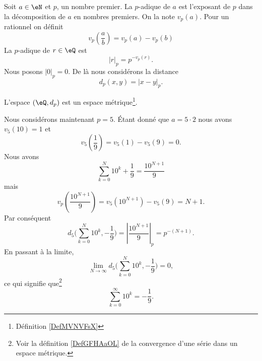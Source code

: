 Soit \( a\in \eN\) et \( p\), un nombre premier. La  \( p\)-adique de \( a\) est l'exposant de \( p\) dans la décomposition de \( a\) en nombres premiers. On la note \( v_p(a)\). Pour un rationnel on définit
\begin{equation}
    v_p\left( \frac{ a }{ b } \right)=v_p(a)-v_p(b)
\end{equation}
La  \( p\)-adique de \( r\in \eQ\) est 
\begin{equation}
    | r |_p=p^{-v_p(r)}.
\end{equation}
Nous posons \( | 0 |_p=0\). De là nous considérons la distance
\begin{equation}
    d_p(x,y)=| x-y |_p.
\end{equation}

\begin{lemma}
    L'espace \( (\eQ,d_p)\) est un espace métrique\footnote{Définition \ref{DefMVNVFsX}}.
\end{lemma}

Nous considérons maintenant \( p=5\). Étant donné que \( a=5\cdot 2\) nous avons \( v_5(10)=1\) et
\begin{equation}
    v_5\left( \frac{1}{ 9 } \right)=v_5(1)-v_5(9)=0.
\end{equation}
Nous avons
\begin{equation}
    \sum_{k=0}^N10^k+\frac{1}{ 9 }=\frac{ 10^{N+1} }{ 9 }
\end{equation}
mais
\begin{equation}
    v_p\left( \frac{ 10^{N+1} }{ 9 } \right)=v_5(10^{N+1})-v_5(9)=N+1.
\end{equation}
Par conséquent
\begin{equation}
    d_5\big( \sum_{k=0}^N10^k,-\frac{1}{ 9 } \big)=| \frac{ 10^{N+1} }{ 9 } |_p=p^{-(N+1)}.
\end{equation}
En passant à la limite,
\begin{equation}
    \lim_{N\to \infty} d_5\big( \sum_{k=0}^N10^k,-\frac{1}{ 9 } \big)=0,
\end{equation}
ce qui signifie que\footnote{Voir la définition \ref{DefGFHAaOL} de la convergence d'une série dans un espace métrique.}
\begin{equation}
    \sum_{k=0}^{\infty}10^k=-\frac{1}{ 9 }.
\end{equation}


